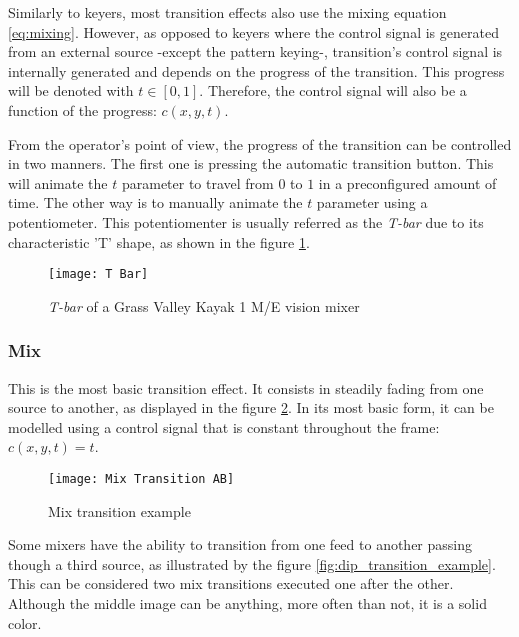 \documentclass[../main.tex]{subfiles}
\begin{document}
Similarly to keyers, most transition effects also use the mixing equation \eqref{eq:mixing}. However, as opposed to keyers where the control signal is generated from an external source -except the pattern keying-, transition's control signal is internally generated and depends on the progress of the transition. This progress will be denoted with $t \in [0, 1]$. Therefore, the control signal will also be a function of the progress: $c(x, y, t)$.\newline

From the operator's point of view, the progress of the transition can be controlled in two manners. The first one is pressing the automatic transition button. This will animate the $t$ parameter to travel from $0$ to $1$ in a preconfigured amount of time. The other way is to manually animate the $t$ parameter using a potentiometer. This potentiomenter is usually referred as the \textit{T-bar} due to its characteristic 'T' shape, as shown in the figure \ref{fig:tbar}.\newline

\begin{figure}[htbp]
    \centering
    \texttt{[image: T Bar]}
    \caption{\textit{T-bar} of a Grass Valley Kayak 1 M/E vision mixer}
    \label{fig:tbar}
\end{figure}

\subsubsection{Mix}
This is the most basic transition effect. It consists in steadily fading from one source to another, as displayed in the figure \ref{fig:mix_transition_example}. In its most basic form, it can be modelled using a control signal that is constant throughout the frame: $c(x, y, t) = t$.\newline

\begin{figure}[htbp]
    \centering
    \texttt{[image: Mix Transition AB]}
    \caption{Mix transition example}
    \label{fig:mix_transition_example}
\end{figure}

Some mixers have the ability to transition from one feed to another passing though a third source, as illustrated by the figure \ref{fig:dip_transition_example}. This can be considered two mix transitions executed one after the other. Although the middle image can be anything, more often than not, it is a solid color\cite{atemManual}.\newline
\end{document}
